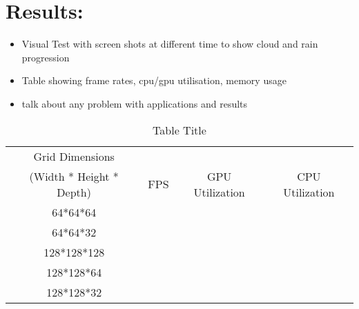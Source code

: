 \section{Results:}
\label{sec:results}
\begin{itemize}
  \item Visual Test with screen shots at different time to show cloud and rain progression
  \item Table showing frame rates, cpu/gpu utilisation, memory usage  
  \item talk about any problem with applications and results 
\end{itemize}


\begin{table}[h]
\centering
\centering\caption{Table Title}
\label{tbl:results}
    \begin{tabular}{c|ccc}
    Grid Dimensions\\(Width * Height * Depth) & FPS & GPU Utilization & CPU Utilization \\ \hline\hline
    64*64*64                                  & ~   & ~               & ~               \\
    64*64*32                                  & ~   & ~               & ~               \\
    128*128*128                               & ~   & ~               & ~               \\
    128*128*64                                & ~   & ~               & ~               \\
    128*128*32                                & ~   & ~               & ~               \\
    \end{tabular}
\end{table}